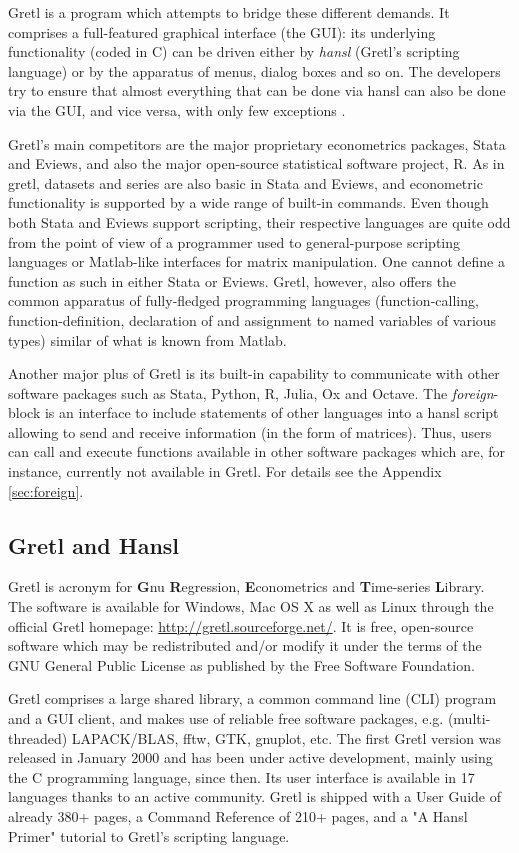 \documentclass[11pt]{article}
\newcommand{\remph}[1]{{\color{myred}#1}}
\begin{document}
Gretl is a program which attempts to bridge these different demands. It comprises a full-featured graphical interface (the GUI): its underlying
functionality (coded in C) can be driven either by \textit{hansl} (Gretl's scripting language) or by the apparatus of menus, dialog boxes and so on. The developers try to ensure that almost everything that can be done via hansl can also be done via the GUI, and vice versa, with only few exceptions \citep{Cottrell2017}.

Gretl's main competitors are the major proprietary econometrics packages, Stata and Eviews, and also the major open-source statistical software project, R. As in gretl, datasets and series are also basic in Stata and Eviews, and econometric functionality is supported by a wide range of built-in commands. Even though both Stata and Eviews support scripting, their respective languages are quite odd from the point of view of a programmer used to general-purpose scripting languages or Matlab-like interfaces for matrix manipulation. \remph{One cannot define a function as
such in either Stata or Eviews.} Gretl, however, also offers the common apparatus of fully-fledged programming languages (function-calling, function-definition, declaration of and assignment to named variables of various types) similar of what is known from Matlab.

Another major plus of Gretl is its built-in capability to communicate with other software packages such as Stata, Python, R, Julia, Ox and Octave. The \textit{foreign}-block is an interface to include statements of other languages into a hansl script allowing to send and receive information (in the form of matrices). Thus, users can call and execute functions available in other software packages which are, for instance, currently not available in Gretl. For details see the Appendix \ref{sec:foreign}.

\subsection{Gretl and Hansl}
Gretl is acronym for \textbf{G}nu \textbf{R}egression, \textbf{E}conometrics and \textbf{T}ime-series \textbf{L}ibrary. The software is available for Windows, Mac OS X as well as Linux through the official Gretl homepage: \url{http://gretl.sourceforge.net/}. It is free, open-source software which may be redistributed and/or modify it under the terms of the GNU General Public License as published by the Free Software Foundation.

Gretl comprises a large shared library, a common command line (CLI) program and a GUI client, and makes use of reliable free software packages, e.g. (multi-threaded) LAPACK/BLAS, fftw, GTK, gnuplot, etc. The first Gretl version was released in January 2000 and has been under active development, mainly using the C programming language, since then. Its user interface is available in 17 languages thanks to an active community. Gretl is shipped with a User Guide of already 380+ pages, a Command Reference of 210+ pages, and a "A Hansl Primer" tutorial to Gretl's scripting language.%
\end{document}
